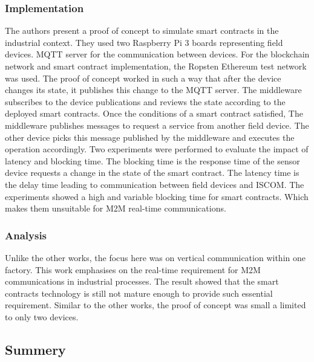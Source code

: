 \documentclass[runningheads]{llncs}
\begin{document}
\subsubsection{Implementation}
 The authors present a proof of concept to simulate smart contracts in the industrial context. They used two Raspberry Pi 3 boards representing field devices. MQTT server for the communication between devices. For the blockchain network and smart contract implementation, the Ropsten Ethereum test network was used. The proof of concept worked in such a way that after the device changes its state, it publishes this change to the MQTT server. The middleware subscribes to the device publications and reviews the state according to the deployed smart contracts. Once the conditions of a smart contract satisfied, The middleware publishes messages to request a service from another field device. The other device picks this message published by the middleware and executes the operation accordingly. Two experiments were performed to evaluate the impact of latency and blocking time. The blocking time is the response time of the sensor device requests a change in the state of the smart contract.  The latency time is the delay time leading to communication between field devices and ISCOM. The experiments showed a high and variable blocking time for smart contracts. Which makes them unsuitable for M2M real-time communications. 

\subsubsection{Analysis}
Unlike the other works, the focus here was on vertical communication within one factory. This work emphasises on the real-time requirement for M2M communications in industrial processes. The result showed that the smart contracts technology is still not mature enough to provide such essential requirement. Similar to the other works, the proof of concept was small a limited to only two devices. 

\subsection{Summery}

\newpage
\end{document}
